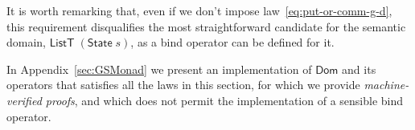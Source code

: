 \documentclass{llncs}
\newcommand{\Conid}[1]{\mathit{#1}}
\newcommand{\Varid}[1]{\mathit{#1}}
\let\Varid\mathit
\let\Conid\mathsf
\begin{document}

It is worth remarking that, even if we don't impose law~\eqref{eq:put-or-comm-g-d},
this requirement disqualifies the most
straightforward candidate for the semantic domain, \ensuremath{\Conid{ListT}\;(\Conid{State}\;\Varid{s})}, as a
bind operator can be defined for it.

In Appendix~\ref{sec:GSMonad} we present an implementation of \ensuremath{\Conid{Dom}} and its
operators that satisfies all the laws in this section, for which we provide
\emph{machine-verified proofs}, and which does not permit
the implementation of a sensible bind operator.
\end{document}
